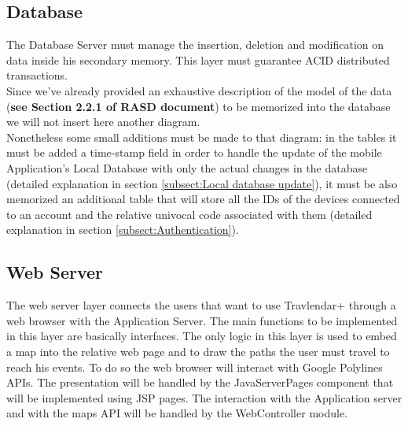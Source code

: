 \subsection{Database}
\label{subsect:Database}
	The Database Server must manage the insertion, deletion and modification on data inside his secondary memory. This layer must guarantee ACID distributed transactions.\\
	Since we've already provided an exhaustive description of the model of the data (\textbf{see Section 2.2.1 of RASD document}) to be memorized into the database we will not insert here another diagram.\\
	Nonetheless some small additions must be made to that diagram: in the tables it must be added a time-stamp field in order to handle the update of the mobile Application's Local Database with only the actual changes in the database (detailed explanation in section \ref{subsect:Local database update}), it must be also memorized an additional table that will store all the IDs of the devices connected to an account and the relative univocal code associated with them (detailed explanation in section \ref{subsect:Authentication}).	

\subsection{Web Server}
\label{subsect:Web Server}
	The web server layer connects the users that want to use Travlendar+ through a web browser with the Application Server. \newline
	The main functions to be implemented in this layer are basically interfaces.
	The only logic in this layer is used to embed a map into the relative web page and to draw the paths the user must travel to reach his events. To do so the web browser will interact with Google Polylines APIs.\newline
	The presentation will be handled by the JavaServerPages component that will be implemented using JSP pages. The interaction with the Application server and with the maps API will be handled by the WebController module.


